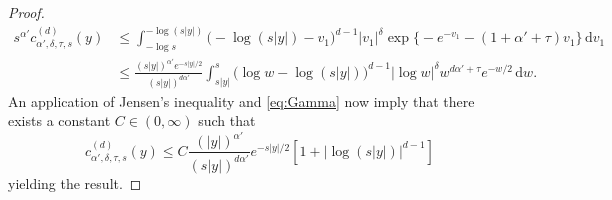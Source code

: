 \documentclass[11pt,reqno]{amsart}
\numberwithin{equation}{section}
\theoremstyle{definition}
\newcommand{\diff}{{\,\mathrm d}}
\begin{document}
\begin{proof}
		\begin{align*}
		s^{\alpha'} c_{\alpha',\delta,\tau,s}^{(d)}(y)&\le \int_{-\log s}^{-\log (s|y|)}  \Big(-\log (s|y|) -
		v_1\Big)^{d-1}|v_1|^\delta \exp\Big\{-e^{-v_1} - (1+\alpha'+\tau)v_1\Big\} \diff v_1\\
		&\le \frac{(s|y|)^{\alpha'} e^{-s|y|/2}}{(s|y|)^{d\alpha'}}  \int_{s|y|}^{s} \Big(\log w-\log (s|y|)\Big)^{d-1} |\log w|^\delta w^{d\alpha'+\tau} e^{-w/2} \diff w.
	\end{align*}
An application of Jensen's inequality and \eqref{eq:Gamma} now imply that there exists a constant $C \in (0,\infty)$ such that
$$
c_{\alpha',\delta,\tau,s}^{(d)}(y) \le C\frac{(|y|)^{\alpha'}}{(s|y|)^{d\alpha'}} e^{-s|y|/2} \left[1+ \big|\log (s|y|)\big|^{d-1}\right]
$$
yielding the result.
\end{proof}
\end{document}
